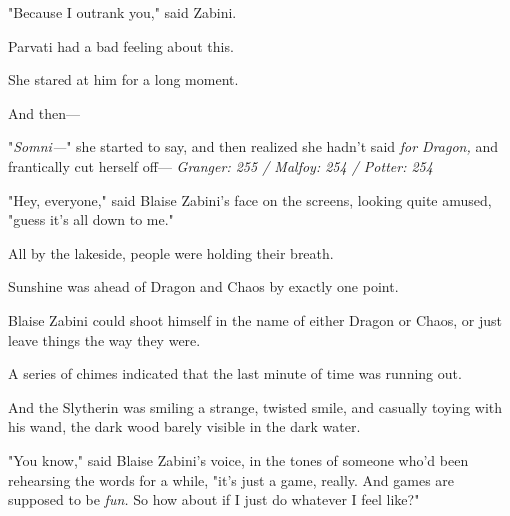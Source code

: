"Because I outrank you," said Zabini.

Parvati had a bad feeling about this.

She stared at him for a long moment.

And then---

"\emph{Somni---}" she started to say, and then realized she hadn't said \emph{for 
Dragon,} and frantically cut herself off---
\sbreak
\emph{Granger: 255 / Malfoy: 254 / Potter: 254}

"Hey, everyone," said Blaise Zabini's face on the screens, looking quite 
amused, "guess it's all down to me."

All by the lakeside, people were holding their breath.

Sunshine was ahead of Dragon and Chaos by exactly one point.

Blaise Zabini could shoot himself in the name of either Dragon or Chaos, or 
just leave things the way they were.

A series of chimes indicated that the last minute of time was running out.

And the Slytherin was smiling a strange, twisted smile, and casually toying 
with his wand, the dark wood barely visible in the dark water.

"You know," said Blaise Zabini's voice, in the tones of someone who'd been 
rehearsing the words for a while, "it's just a game, really. And games are 
supposed to be \emph{fun.} So how about if I just do whatever I feel like?"

